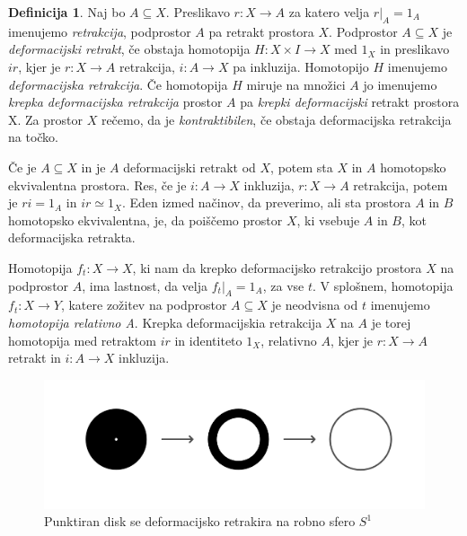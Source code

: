\documentclass[a4paper,12pt]{article}
\theoremstyle{definition}
\newtheorem{definicija}{Definicija}
\theoremstyle{plain}
\theoremstyle{definition}
\theoremstyle{plain}
\theoremstyle{plain}
\theoremstyle{plain}
\theoremstyle{plain}
\begin{document}
\begin{definicija}
    Naj bo $A \subseteq X$. Preslikavo $r : X \rightarrow A$ za katero 
    velja $r|_A = 1_A$ imenujemo \textit{retrakcija}, podprostor
     $A$ pa retrakt prostora $X$. Podprostor $A \subseteq X$ je 
     \textit{deformacijski retrakt}, če obstaja homotopija $H : X \times
      I \rightarrow X$ med $1_X$ in preslikavo $ir$, kjer je $r : X 
      \rightarrow A$ retrakcija, $i:A\rightarrow X$ pa inkluzija. Homotopijo $H$ imenujemo \textit{deformacijska 
      retrakcija}. Če homotopija $H$ miruje na množici $A$ jo imenujemo 
      \textit{krepka deformacijska retrakcija} prostor $A$ pa 
      \textit{krepki deformacijski} retrakt prostora X. Za prostor $X$ rečemo, da je \textit{kontraktibilen}, če obstaja deformacijska retrakcija na točko.
\end{definicija}

Če je $A\subseteq X$ in je $A$ deformacijski retrakt od $X$, potem sta 
$X$ in $A$ homotopsko ekvivalentna prostora. Res, če je $i:A\rightarrow
 X$ inkluzija, $r:X\rightarrow A$ retrakcija, potem je $ri=1_A$
  in $ir\simeq1_X$. Eden izmed načinov, da preverimo, ali sta
   prostora $A$ in $B$ homotopsko ekvivalentna, je, da poiščemo prostor
    $X$, ki vsebuje $A$ in $B$, kot deformacijska retrakta. 

Homotopija $f_t: X\rightarrow X$, ki nam da krepko deformacijsko retrakcijo 
prostora $X$ na podprostor $A$, ima lastnost, da velja 
$f_t|_A=1_A$, za vse $t$. V splošnem, homotopija 
$f_t:X\rightarrow Y$, katere zožitev na podprostor $A\subseteq X$ je 
neodvisna od $t$ imenujemo \textit{homotopija relativno A}. Krepka 
deformacijskia retrakcija $X$ na $A$ je torej homotopija med retraktom
 $ir$ in identiteto $1_X$, relativno $A$, kjer je $r:X\rightarrow A$ retrakt in $i:A\rightarrow X$ inkluzija.


\begin{figure}[h!]
    \centering
    \includegraphics[width=1\linewidth]{def-retract.png}
    \caption{Punktiran disk se deformacijsko retrakira na robno sfero $S^1$}
\end{figure}
\end{document}
